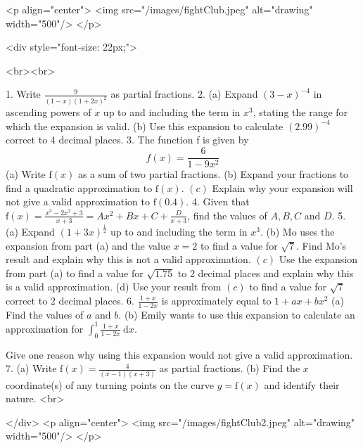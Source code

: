 <p align="center">
<img src="/images/fightClub.jpeg" alt="drawing" width="500"/>
</p>

<div style="font-size: 22px;">

<br><br>

1. Write $\frac{9}{(1-x)(1+2 x)^{2}}$ as partial fractions.
2. (a) Expand $(3-x)^{-4}$ in ascending powers of $x$ up to and including the term in $x^{3}$, stating the range for which the expansion is valid.
(b) Use this expansion to calculate $(2.99)^{-4}$ correct to 4 decimal places.
3. The function f is given by
$$
f(x)=\frac{6}{1-9 x^{2}}
$$
(a) Write $\mathrm{f}(x)$ as a sum of two partial fractions.
(b) Expand your fractions to find a quadratic approximation to $\mathrm{f}(x)$.
\((c)\) Explain why your expansion will not give a valid approximation to $\mathrm{f}(0.4)$.
4. Given that $\mathrm{f}(x)=\frac{x^{3}-2 x^{2}+3}{x+3}=A x^{2}+B x+C+\frac{D}{x+3}$, find the values of $A, B, C$ and $D$.
5. (a) Expand $(1+3 x)^{\frac{1}{2}}$ up to and including the term in $x^{3}$.
(b) Mo uses the expansion from part (a) and the value $x=2$ to find a value for $\sqrt{7}$. Find Mo's result and explain why this is not a valid approximation.
\((c)\) Use the expansion from part (a) to find a value for $\sqrt{1.75}$ to 2 decimal places and explain why this is a valid approximation.
(d) Use your result from \((c)\) to find a value for $\sqrt{7}$ correct to 2 decimal places.
6. $\frac{1+x}{1-2 x}$ is approximately equal to $1+a x+b x^{2}$
(a) Find the values of $a$ and $b$.
(b) Emily wants to use this expansion to calculate an approximation for $\int_{0}^{1} \frac{1+x}{1-2 x} \mathrm{~d} x$.

Give one reason why using this expansion would not give a valid approximation.
7. (a) Write $\mathrm{f}(x)=\frac{4}{(x-1)(x+3)}$ as partial fractions.
(b) Find the $x$ coordinate(s) of any turning points on the curve $y=\mathrm{f}(x)$ and identify their nature.
<br>

</div>
<p align="center">
<img src="/images/fightClub2.jpeg" alt="drawing" width="500"/>
</p>
